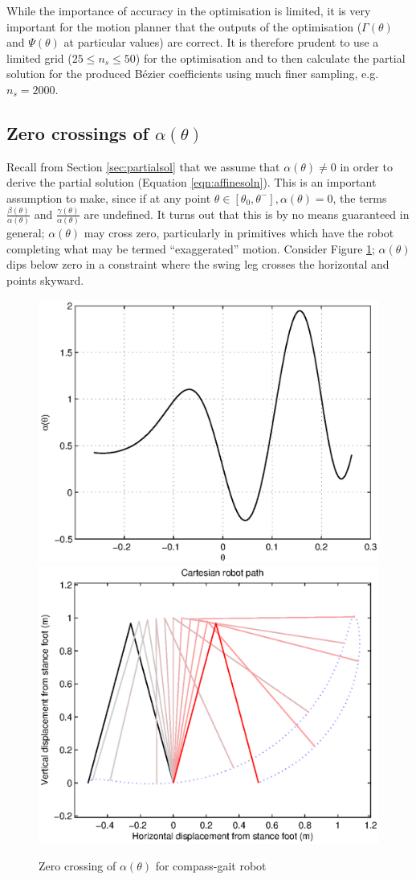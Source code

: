 While the importance of accuracy in the optimisation is limited, it is very important for the motion planner that the outputs of the optimisation ($\Gamma(\theta)$ and $\Psi(\theta)$ at particular values) are correct. It is therefore prudent to use a limited grid ($25 \leq n_s \leq 50$) for the optimisation and to then calculate the partial solution for the produced Bézier coefficients using much finer sampling, e.g. $n_s = 2000$. 

\subsection{Zero crossings of $\alpha(\theta)$}
Recall from Section \ref{sec:partialsol} that we assume that $\alpha(\theta)\neq 0$ in order to derive the partial solution (Equation \ref{eqn:affinesoln}). This is an important assumption to make, since if at any point $\theta \in [\theta_0, \theta^-], \alpha(\theta) = 0$, the terms $\frac{\beta(\theta)}{\alpha(\theta)}$ and $\frac{\gamma(\theta)}{\alpha(\theta)}$ are undefined. It turns out that this is by no means guaranteed in general; $\alpha(\theta)$ may cross zero, particularly in primitives which have the robot completing what may be termed ``exaggerated'' motion. Consider Figure \ref{fig:alphazerocrossing}; $\alpha(\theta)$ dips below zero in a constraint where the swing leg crosses the horizontal and points skyward.

\begin{figure}
	\centering
	\includegraphics[width=0.49\linewidth]{4VirtConstLib/al0Crossing.eps}
	\includegraphics[width=0.49\linewidth]{4VirtConstLib/xy-0Crossing.eps}
	\caption{Zero crossing of $\alpha(\theta)$ for compass-gait robot}
	\label{fig:alphazerocrossing}
\end{figure}

